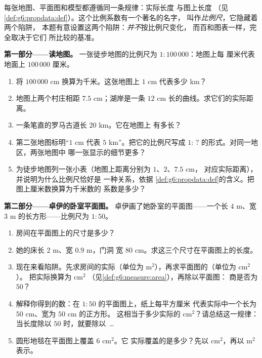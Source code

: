 \begin{problem}
\label{pb:g6:propdata:1}
每张地图、平面图和模型都遵循同一条规律：实际长度
与图上长度\emph{}
（见\cref{def:g6:propdata:def}）。这个比例系数有一个著名的名字，
叫作\emph{比例尺}，它隐藏着两个陷阱，
本题有意设置这两个陷阱：\emph{并不}按比例尺变化，
而百和图表一样，完全取决于它们
所比较的基准。

\medskip
\noindent\textbf{第一部分——读地图。}
一张徒步地图的比例尺为 $1:100\,000$：地图上每
厘米代表地面上 $100\,000$ 厘米。
\begin{enumerate}
  \item 将 $100\,000$ cm 换算为千米。这张地图上 $1$ cm
        代表多少 km？
  \item 地图上两个村庄相距 $7.5$ cm；湖岸是一条
        $12$ cm 长的曲线。求它们的实际距离。
  \item 一条笔直的罗马古道长 $20$ km。它在地图上
        有多长？
  \item 第二张地图标明“$1$ cm 代表 $5$ km”。把它的比例尺写成
        $1: \,?$ 的形式。对同一地区，两张地图中
        哪一张显示的细节更多？
  \item 为徒步地图列一张小表（地图上距离分别为 $1$、$2$、$7.5$ cm，
        对应实际距离），并说明为什么比例尺恰好是
        一种关系，依据
        \cref{def:g6:propdata:def}的含义。把图上厘米数换算为千米数的
        系数是多少？
\end{enumerate}

\medskip
\noindent\textbf{第二部分——卓伊的卧室平面图。}
卓伊画了她卧室的平面图——一个长 $4$ m、宽
$3$ m 的长方形——比例尺为 $1:50$。
\begin{enumerate}[resume]
  \item 房间在平面图上的尺寸是多少？
  \item 她的床长 $2$ m、宽 $0.9$ m，门洞
        宽 $80$ cm。求这三个尺寸在平面图上的长度。
  \item 现在来看陷阱。先求房间的实际（单位为
        m$^2$），再求平面图的（单位为 cm$^2$）。
        把实际换算为 cm$^2$
        （见\cref{def:g6:measure:area}），再除以平面图：
        商是否为 $50$？
  \item 解释你得到的数：在 $1:50$ 的平面图上，纸上每平方厘米
        代表实际中一个长为 $50$ cm、宽为 $50$ cm 的正方形。
        这相当于多少实际的 cm$^2$？请总结这一规律：
        当长度除以 $50$ 时，就要除以
        \,\dots
  \item 圆形地毯在平面图上覆盖 $6$ cm$^2$。它
        实际覆盖的是多少？先以 cm$^2$，再以 m$^2$ 表示。
\end{enumerate}


\end{problem}
